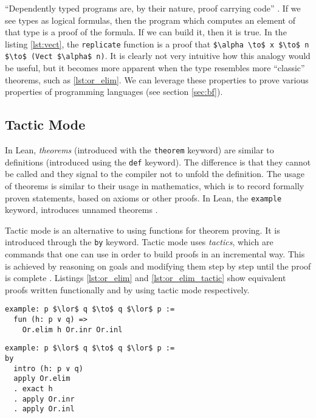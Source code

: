 \documentclass[runningheads]{llncs}
\newcommand{\cc}{\lstinline[mathescape]}
\begin{document}
``Dependently typed programs are, by their nature, proof carrying code''
\cite{altenkirch2005dependent}. If we see types as logical formulas, then the
program which computes an element of that type is a proof of the formula. If we
can build it, then it is true. In the listing \ref{lst:vect}, the
\lstinline{replicate} function is a proof that \lstinline[mathescape]{$\alpha
\to$ x $\to$ n $\to$ (Vect $\alpha$ n)}. It is clearly not very intuitive how
this analogy would be useful, but it becomes more apparent when the type
resembles more ``classic'' theorems, such as \ref{lst:or_elim}. We can leverage
these properties to prove various properties of programming languages (see
section \ref{sec:bf}).

\subsection{Tactic Mode}

In Lean, \emph{theorems} (introduced with the \cc{theorem} keyword) are similar
to definitions (introduced using the \cc{def} keyword). The difference is that
they cannot be called and they signal to the compiler not to unfold the
definition. The usage of theorems is similar to their usage in mathematics,
which is to record formally proven statements, based on axioms or other proofs.
In Lean, the \cc{example} keyword, introduces unnamed theorems
\cite{theorem_proving_in_lean4}.

Tactic mode is an alternative to using functions for theorem proving. It is
introduced through the \lstinline{by} keyword. Tactic mode uses \emph{tactics},
which are commands that one can use in order to build proofs in an incremental
way. This is achieved by reasoning on goals and modifying them step by step
until the proof is complete \cite{theorem_proving_in_lean4}. Listings
\ref{lst:or_elim} and \ref{lst:or_elim_tactic} show equivalent proofs written
functionally and by using tactic mode respectively.

\begin{multicols}{2}

\begin{lstlisting}[mathescape, label=lst:or_elim,
    caption={A proof example for a theorem expressed in propositional logic. We
    use the Or.elim theorem and the Or.inl and Or.inr constructurs for a
    logical Or expression, which are built into the standard Lean library. See
    \ref{lst:defs} for the definitions of these constructs.}]
example: p $\lor$ q $\to$ q $\lor$ p :=
  fun (h: p ∨ q) =>
    Or.elim h Or.inr Or.inl
\end{lstlisting}

\columnbreak

\begin{lstlisting}[mathescape, label=lst:or_elim_tactic, 
    caption={An equivalent implementation to \ref{lst:or_elim} can be given
    using tactics.}]
example: p $\lor$ q $\to$ q $\lor$ p :=
by
  intro (h: p ∨ q)
  apply Or.elim
  . exact h
  . apply Or.inr
  . apply Or.inl
\end{lstlisting}

\end{multicols}
\end{document}
